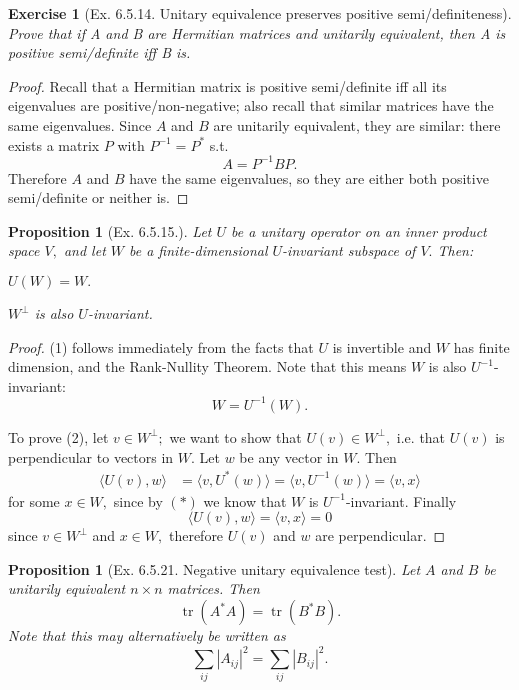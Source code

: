 \documentclass[12pt]{article}
\let\oldBeginEnumerate=\enumerate
\let\oldEndEnumerate=\endenumerate
\renewenvironment{enumerate}{
\oldBeginEnumerate
  \setlength{\itemsep}{0pt}
  \setlength{\parskip}{0pt}
  \setlength{\parsep}{0pt}
}{\oldEndEnumerate}
\theoremstyle{plain}
\newtheorem{proposition}[theorem]{Proposition}
\newtheorem{exercise}[theorem]{Exercise}
\theoremstyle{definition}
\theoremstyle{remark}
\DeclareMathOperator{\tr}{tr}
\newcommand{\0}{\varnothing}
\newcommand{\<}{\langle}
\renewcommand{\>}{\rangle}
\begin{document}
\begin{exercise}[Ex. 6.5.14. Unitary equivalence preserves positive semi/definiteness]
Prove that if A and B are Hermitian matrices and unitarily equivalent, then A is positive semi/definite iff B is.
\end{exercise}

\begin{proof}
Recall that a Hermitian matrix is positive semi/definite iff all its eigenvalues are positive/non-negative; also recall that similar matrices have the same eigenvalues. Since $ A $ and $ B $ are unitarily equivalent, they are similar: there exists a matrix $ P $ with $ P^{-1} = P^{*} $ s.t. $$
  A = P^{-1} B P.
$$
Therefore $ A $ and $ B $ have the same eigenvalues, so they are either both positive semi/definite or neither is.
\end{proof}

\begin{proposition}[Ex. 6.5.15.]
Let $ U $ be a unitary operator on an inner product space $ V, $ and let $ W $ be a finite-dimensional $ U $-invariant subspace of $ V. $ Then:
\begin{enumerate}
  \item $ U(W) = W. $
  \item $ W^\perp $ is also $ U $-invariant.
\end{enumerate}
\end{proposition}

\begin{proof}
(1) follows immediately from the facts that $ U $ is invertible and $ W $ has finite dimension, and the Rank-Nullity Theorem. Note that this means $ W $ is also $ U^{-1} $-invariant: \[
W = U^{-1} (W).\tag{$ * $}
\]

To prove (2), let $ v \in W^{\perp};$ we want to show that $ U(v) \in W^\perp, $ i.e. that $ U(v) $ is perpendicular to vectors in $ W. $ Let $ w $ be any vector in $ W. $ Then \begin{align*}
\< U(v), w \> &= \< v, U^*(w) \> = \< v, U^{-1}(w) \> = \< v, x \>
\end{align*}
for some $ x \in W, $ since by $ (*) $ we know that $ W $ is $ U^{-1} $-invariant. Finally \[
  \< U(v), w \> = \< v, x \> = 0
\]
since $ v \in W^{\perp} $ and $ x \in W, $ therefore $ U(v) $ and $ w $ are perpendicular.
\end{proof}

\begin{proposition}[Ex. 6.5.21. Negative unitary equivalence test]
Let $ A $  and $ B $ be unitarily equivalent $ n\times n $ matrices. Then \[
\tr(A^* A) = \tr(B^* B).
\]
Note that this may alternatively be written as \[
\sum_{ij} | A_{ij} |^2 = \sum_{ij} | B_{ij} |^2.
\]
\end{proposition}
\end{document}
